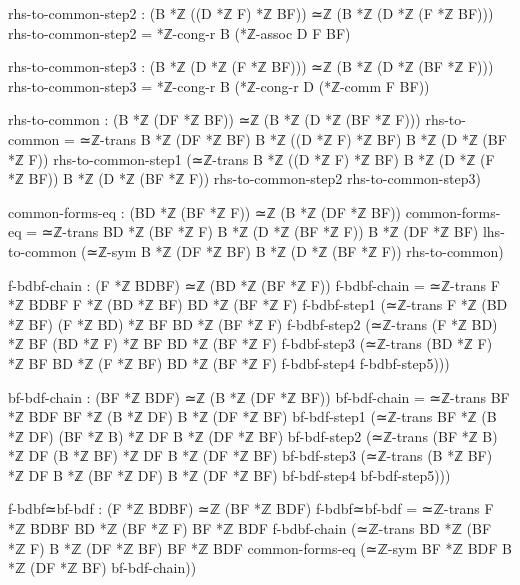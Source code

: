\documentclass[11pt,a4paper]{book}
\begin{document}
\begin{code}
        rhs-to-common-step2 : (B *ℤ ((D *ℤ F) *ℤ BF)) ≃ℤ (B *ℤ (D *ℤ (F *ℤ BF)))
        rhs-to-common-step2 = *ℤ-cong-r B (*ℤ-assoc D F BF)
        
        rhs-to-common-step3 : (B *ℤ (D *ℤ (F *ℤ BF))) ≃ℤ (B *ℤ (D *ℤ (BF *ℤ F)))
        rhs-to-common-step3 = *ℤ-cong-r B (*ℤ-cong-r D (*ℤ-comm F BF))
        
        rhs-to-common : (B *ℤ (DF *ℤ BF)) ≃ℤ (B *ℤ (D *ℤ (BF *ℤ F)))
        rhs-to-common = ≃ℤ-trans {B *ℤ (DF *ℤ BF)} {B *ℤ ((D *ℤ F) *ℤ BF)} {B *ℤ (D *ℤ (BF *ℤ F))}
                         rhs-to-common-step1
                         (≃ℤ-trans {B *ℤ ((D *ℤ F) *ℤ BF)} {B *ℤ (D *ℤ (F *ℤ BF))} {B *ℤ (D *ℤ (BF *ℤ F))}
                           rhs-to-common-step2 rhs-to-common-step3)

        common-forms-eq : (BD *ℤ (BF *ℤ F)) ≃ℤ (B *ℤ (DF *ℤ BF))
        common-forms-eq = ≃ℤ-trans {BD *ℤ (BF *ℤ F)} {B *ℤ (D *ℤ (BF *ℤ F))} {B *ℤ (DF *ℤ BF)}
                           lhs-to-common (≃ℤ-sym {B *ℤ (DF *ℤ BF)} {B *ℤ (D *ℤ (BF *ℤ F))} rhs-to-common)

        f-bdbf-chain : (F *ℤ BDBF) ≃ℤ (BD *ℤ (BF *ℤ F))
        f-bdbf-chain = ≃ℤ-trans {F *ℤ BDBF} {F *ℤ (BD *ℤ BF)} {BD *ℤ (BF *ℤ F)}
                        f-bdbf-step1
                        (≃ℤ-trans {F *ℤ (BD *ℤ BF)} {(F *ℤ BD) *ℤ BF} {BD *ℤ (BF *ℤ F)}
                          f-bdbf-step2
                          (≃ℤ-trans {(F *ℤ BD) *ℤ BF} {(BD *ℤ F) *ℤ BF} {BD *ℤ (BF *ℤ F)}
                            f-bdbf-step3
                            (≃ℤ-trans {(BD *ℤ F) *ℤ BF} {BD *ℤ (F *ℤ BF)} {BD *ℤ (BF *ℤ F)}
                              f-bdbf-step4 f-bdbf-step5)))

        bf-bdf-chain : (BF *ℤ BDF) ≃ℤ (B *ℤ (DF *ℤ BF))
        bf-bdf-chain = ≃ℤ-trans {BF *ℤ BDF} {BF *ℤ (B *ℤ DF)} {B *ℤ (DF *ℤ BF)}
                        bf-bdf-step1
                        (≃ℤ-trans {BF *ℤ (B *ℤ DF)} {(BF *ℤ B) *ℤ DF} {B *ℤ (DF *ℤ BF)}
                          bf-bdf-step2
                          (≃ℤ-trans {(BF *ℤ B) *ℤ DF} {(B *ℤ BF) *ℤ DF} {B *ℤ (DF *ℤ BF)}
                            bf-bdf-step3
                            (≃ℤ-trans {(B *ℤ BF) *ℤ DF} {B *ℤ (BF *ℤ DF)} {B *ℤ (DF *ℤ BF)}
                              bf-bdf-step4 bf-bdf-step5)))

        f-bdbf≃bf-bdf : (F *ℤ BDBF) ≃ℤ (BF *ℤ BDF)
        f-bdbf≃bf-bdf = ≃ℤ-trans {F *ℤ BDBF} {BD *ℤ (BF *ℤ F)} {BF *ℤ BDF}
                         f-bdbf-chain
                         (≃ℤ-trans {BD *ℤ (BF *ℤ F)} {B *ℤ (DF *ℤ BF)} {BF *ℤ BDF}
                           common-forms-eq
                           (≃ℤ-sym {BF *ℤ BDF} {B *ℤ (DF *ℤ BF)} bf-bdf-chain))


\end{code}
\end{document}
